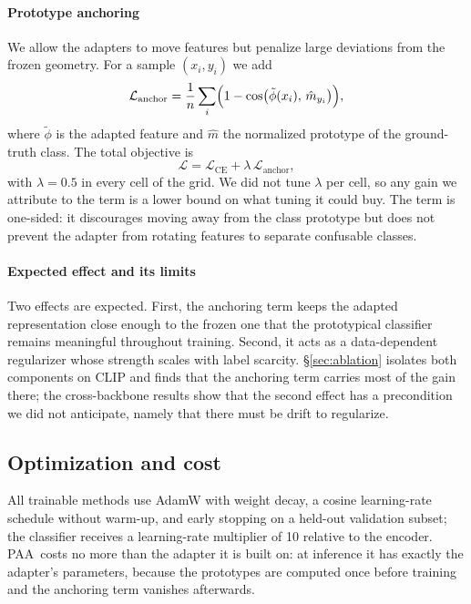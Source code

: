 \documentclass[preprint,12pt]{elsarticle}
\newcommand{\ours}{\textsc{PAA}}
\begin{document}
\paragraph{Prototype anchoring}
We allow the adapters to move features but penalize large deviations from the
frozen geometry. For a sample $(x_i,y_i)$ we add
\begin{equation}
\mathcal{L}_{\text{anchor}} = \frac{1}{n}\sum_{i}
\Bigl(1 - \cos\bigl(\tilde{\phi}(x_i),\, \hat{m}_{y_i}\bigr)\Bigr),
\end{equation}
where $\tilde{\phi}$ is the adapted feature and $\hat{m}$ the normalized
prototype of the ground-truth class. The total objective is
\begin{equation}
\mathcal{L} = \mathcal{L}_{\text{CE}} + \lambda\,\mathcal{L}_{\text{anchor}},
\end{equation}
with $\lambda = 0.5$ in every cell of the grid. We did not tune $\lambda$ per
cell, so any gain we attribute to the term is a lower bound on what tuning it
could buy. The term is one-sided: it discourages moving away from the class
prototype but does not prevent the adapter from rotating features to separate
confusable classes.

\paragraph{Expected effect and its limits}
Two effects are expected. First, the anchoring term keeps the adapted
representation close enough to the frozen one that the prototypical classifier
remains meaningful throughout training. Second, it acts as a data-dependent
regularizer whose strength scales with label scarcity. \S\ref{sec:ablation}
isolates both components on CLIP and finds that the anchoring term carries most
of the gain there; the cross-backbone results show that the second effect has a
precondition we did not anticipate, namely that there must be drift to
regularize.

\subsection{Optimization and cost}

All trainable methods use AdamW with weight decay, a cosine learning-rate
schedule without warm-up, and early stopping on a held-out validation subset; the
classifier receives a learning-rate multiplier of 10 relative to the encoder.
\ours\ costs no more than the adapter it is built on: at inference it has exactly
the adapter's parameters, because the prototypes are computed once before
training and the anchoring term vanishes afterwards.
\end{document}
